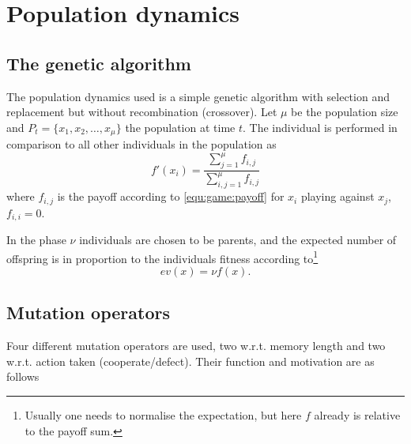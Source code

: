 \section{Population dynamics}\label{sec:genetic}

\subsection{The genetic algorithm}
The population dynamics used is a simple genetic algorithm with selection and replacement but without recombination (crossover). Let $\mu$ be the population size and $P_{t} = \{x_1, x_2, \dots, x_\mu\}$ the population at time $t$. The individual  is performed in comparison to all other individuals in the population as
\begin{equation*}
f'(x_i) = \frac{\sum_{j = 1}^\mu f_{i,j}}{\sum_{i,j = 1}^\mu f_{i, j}}
\end{equation*}
where $f_{i, j}$ is the payoff according to \ref{equ:game:payoff} for $x_i$ playing against $x_j$, $f_{i,i} = 0$.


In the  phase $\nu$ individuals are chosen to be parents, and the expected number of offspring is in proportion to the individuals fitness according to\footnote{Usually one needs to normalise the expectation, but here $f$ already is relative to the payoff sum.}
\begin{equation*}
ev(x) = \nu f(x).
\end{equation*}


\subsection{Mutation operators}
Four different mutation operators are used, two w.r.t. memory length and two w.r.t. action taken (cooperate/defect). Their function and motivation are as follows

